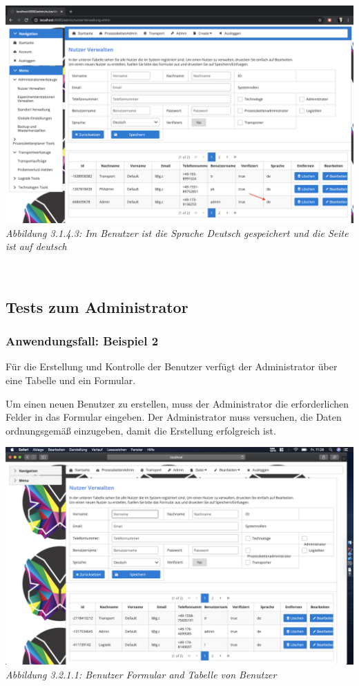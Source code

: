 \documentclass[enabledeprecatedfontcommands,fontsize=12pt,paper=a4,twoside]{scrartcl}
\begin{document}
\hypertarget{sc3.1.4.3.1}{
\includegraphics[width=1\textwidth]{Screenshots/31143.png}
\textit{Abbildung 3.1.4.3: Im Benutzer ist die Sprache Deutsch gespeichert und die Seite ist auf deutsch}
} \\


\subsubsection{}


\subsection{Tests zum Administrator}

\subsubsection{Anwendungsfall: Beispiel 2}
Für die Erstellung und Kontrolle der Benutzer verfügt der Administrator über eine Tabelle und ein Formular.

Um einen neuen Benutzer zu erstellen, muss der Administrator die erforderlichen Felder in das Formular eingeben. Der Administrator muss versuchen, die Daten ordnungsgemäß einzugeben, damit die Erstellung erfolgreich ist.

\hypertarget{sc3.1.2.1}{
\includegraphics[width=1\textwidth]{Screenshots/UserErzeugenFormular.png}
\textit{Abbildung 3.2.1.1: Benutzer Formular and Tabelle von Benutzer}
} \\
\end{document}
